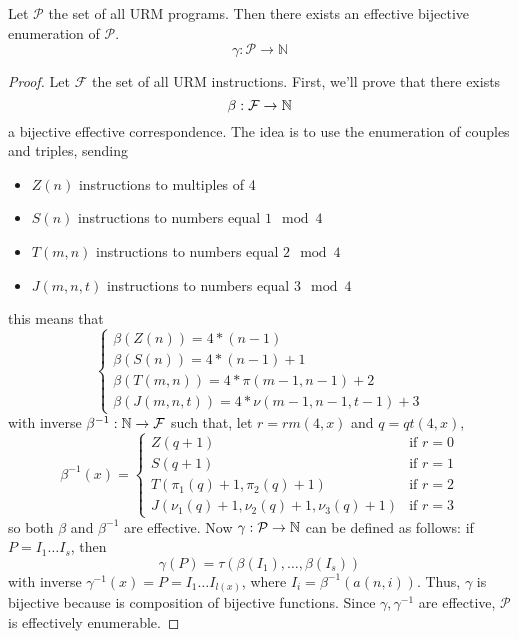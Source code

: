 \begin{theorem}
  Let $\mathcal{P}$ the set of all URM programs. 
  Then there exists an effective bijective enumeration of $\mathcal{P}$.
  \[
    \gamma : \mathcal{P} \to \mathbb{N}
    \]
  \begin{proof}
    Let $\mathcal{F}$ the set of all URM instructions.
    First, we'll prove that there exists
    \[\beta : \mathcal{F} \to \mathbb{N} \]
    a bijective effective correspondence. The idea is to use the
    enumeration of couples and triples, sending
    \begin{itemize}
    \item $Z(n)$ instructions to multiples of 4
    \item $S(n)$ instructions to numbers equal $ 1 \mod 4$
    \item $T(m,n)$ instructions to numbers equal $2 \mod 4$
    \item $J(m,n,t)$ instructions to numbers equal $3 \mod 4$
    \end{itemize}
    this means that
    \begin{equation*}
      \begin{cases}
        \beta(Z(n)) = 4*(n-1)\\
        \beta(S(n)) = 4*(n-1) + 1\\
        \beta(T(m,n)) = 4*\pi(m-1, n-1) + 2\\
        \beta(J(m,n,t)) = 4*\nu(m-1, n-1, t-1) + 3
      \end{cases}
    \end{equation*}
    with inverse $\beta^{-1} : \mathbb{N} \to \mathcal{F}$ such
    that, let $r = rm(4,x)$ and
    $q = qt(4,x)$,
    \[
      \beta^{-1}(x) = \begin{cases}
        Z(q+1) & \mbox{if } r=0 \\
        S(q+1) & \mbox{if } r=1 \\
        T(\pi_1(q)+1, \pi_2(q)+1) & \mbox{if } r=2 \\
        J(\nu_1(q)+1, \nu_2(q)+1, \nu_3(q)+1) & \mbox{if } r=3
      \end{cases}
    \]
    so both $\beta$ and $\beta^{-1}$ are effective. 
    Now
    $\gamma : \mathcal{P} \to \mathbb{N}$ can be defined as follows:
    if 
    $P = I_1 \dots I_s$, then
    \[\gamma(P) = \tau(\beta(I_1), \dots, \beta(I_s))\]
    with inverse $\gamma^{-1}(x) = P = I_1 \dots I_{l(x)}$, where
    $I_i = \beta ^ {-1} (a (n, i))$.
    Thus, $\gamma$ is bijective because is composition of bijective
    functions. Since $\gamma, \gamma^{-1}$ are effective,
    $\mathcal{P}$ is effectively enumerable.
  \end{proof}
\end{theorem}


